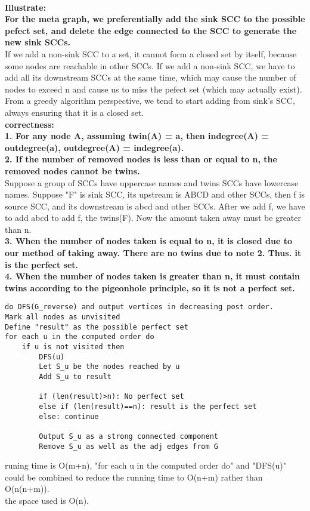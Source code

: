 \documentclass[12pt,a4paper]{article}
\newcommand{\question}[1]{\bigskip\noindent{\textbf{Q{#1} solution}}}
\begin{document}
\question{30}\\
\textbf{Illustrate:}\\
\textbf{For the meta graph, we preferentially add the sink SCC to the possible pefect set, and delete the edge connected to the SCC to generate the new sink SCCs.}\\
If we add a non-sink SCC to a set, it cannot form a closed set by itself, because some nodes are reachable in other SCCs. If we add a non-sink SCC, we have to add all its downstream SCCs at the same time, which may cause the number of nodes to exceed n and cause us to miss the pefect set (which may actually exist). From a greedy algorithm perspective, we tend to start adding from sink's SCC, always ensuring that it is a closed set.\\
\textbf{correctness:}\\
\textbf{1. For any node A, assuming twin(A) = a, then indegree(A) = outdegree(a), outdegree(A) = indegree(a).}\\
\textbf{2. If the number of removed nodes is less than or equal to n, the removed nodes cannot be twins.}\\
Suppose a group of SCCs have uppercase names and twins SCCs have lowercase names. Suppose "F" is sink SCC, its upstream is ABCD and other SCCs, then f is source SCC, and its downstream is abcd and other SCCs. After we add f, we have to add abcd to add f, the twins(F). Now the amount taken away must be greater than n.\\
\textbf{3. When the number of nodes taken is equal to n, it is closed due to our method of taking away. There are no twins due to note 2. Thus. it is the perfect set.}\\
\textbf{4. When the number of nodes taken is greater than n, it must contain twins according to the pigeonhole principle, so it is not a perfect set.}\\
\begin{lstlisting}
do DFS(G_reverse) and output vertices in decreasing post order.
Mark all nodes as unvisited
Define "result" as the possible perfect set
for each u in the computed order do
	if u is not visited then
		DFS(u)
		Let S_u be the nodes reached by u
		Add S_u to result 

		if (len(result)>n): No perfect set
		else if (len(result)==n): result is the perfect set
		else: continue

		Output S_u as a strong connected component
		Remove S_u as well as the adj edges from G
\end{lstlisting}
runing time is O(m+n), "for each u in the computed order do" and "DFS(u)" could be combined to reduce the running time to O(n+m) rather than O(n(n+m)).\\
the space used is O(n).\\
\end{document}
